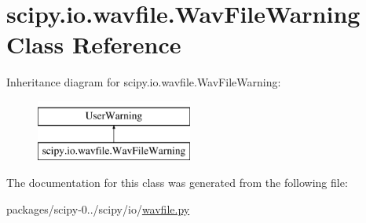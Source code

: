 \hypertarget{classscipy_1_1io_1_1wavfile_1_1WavFileWarning}{}\section{scipy.\+io.\+wavfile.\+Wav\+File\+Warning Class Reference}
\label{classscipy_1_1io_1_1wavfile_1_1WavFileWarning}
Inheritance diagram for scipy.\+io.\+wavfile.\+Wav\+File\+Warning\+:\begin{figure}[H]
\begin{center}
\leavevmode
\includegraphics[height=2.000000cm]{classscipy_1_1io_1_1wavfile_1_1WavFileWarning}
\end{center}
\end{figure}


The documentation for this class was generated from the following file\+:\begin{DoxyCompactItemize}
\item 
packages/scipy-\/0../scipy/io/\hyperlink{wavfile_8py}{wavfile.\+py}\end{DoxyCompactItemize}
